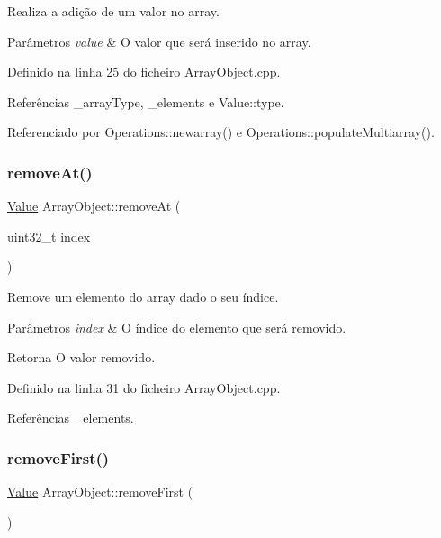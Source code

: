 Realiza a adição de um valor no array. 


\begin{DoxyParams}{Parâmetros}
{\em value} & O valor que será inserido no array. \\
\hline
\end{DoxyParams}


Definido na linha 25 do ficheiro Array\+Object.\+cpp.



Referências \+\_\+array\+Type, \+\_\+elements e Value\+::type.



Referenciado por Operations\+::newarray() e Operations\+::populate\+Multiarray().

\mbox{\label{classArrayObject_ab229e48175e46d03c2fab756cce11b5f}} 
\subsubsection{\texorpdfstring{remove\+At()}{removeAt()}}
{\footnotesize\ttfamily \hyperlink{structValue}{Value} Array\+Object\+::remove\+At (\begin{DoxyParamCaption}\item[{uint32\+\_\+t}]{index }\end{DoxyParamCaption})}



Remove um elemento do array dado o seu índice. 


\begin{DoxyParams}{Parâmetros}
{\em index} & O índice do elemento que será removido. \\
\hline
\end{DoxyParams}
\begin{DoxyReturn}{Retorna}
O valor removido. 
\end{DoxyReturn}


Definido na linha 31 do ficheiro Array\+Object.\+cpp.



Referências \+\_\+elements.

\mbox{\label{classArrayObject_aaf722b5670d62f09370aeab36ebe0dfd}} 
\subsubsection{\texorpdfstring{remove\+First()}{removeFirst()}}
{\footnotesize\ttfamily \hyperlink{structValue}{Value} Array\+Object\+::remove\+First (\begin{DoxyParamCaption}{ }\end{DoxyParamCaption})}



